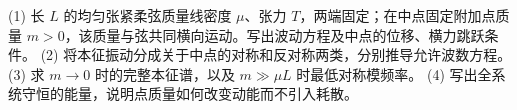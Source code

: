 (1) 长 \(L\) 的均匀张紧柔弦质量线密度 \(\mu\)、张力 \(T\)，两端固定；在中点固定附加点质量 \(m>0\)，该质量与弦共同横向运动。写出波动方程及中点的位移、横力跳跃条件。
(2) 将本征振动分成关于中点的对称和反对称两类，分别推导允许波数方程。
(3) 求 \(m\to0\) 时的完整本征谱，以及 \(m\gg\mu L\) 时最低对称模频率。
(4) 写出全系统守恒的能量，说明点质量如何改变动能而不引入耗散。
